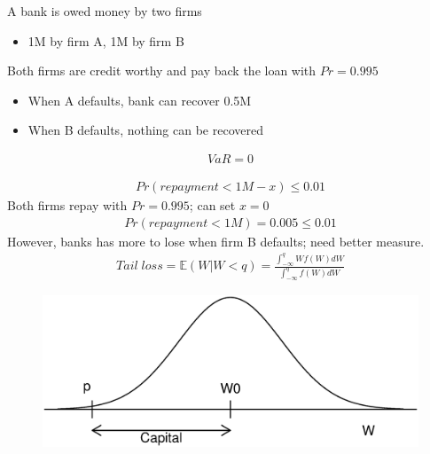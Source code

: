 \documentclass{beamer}
\begin{document}
\begin{frame} 
  A bank is owed money by two firms
  \begin{itemize}
    \item 1M by firm A, 1M by firm B
  \end{itemize}
  Both firms are credit worthy and pay back the loan with $Pr=0.995$
  \begin{itemize}
    \item When A defaults, bank can recover 0.5M
    \item When B defaults, nothing can be recovered
  \end{itemize}
  \begin{align}
    VaR=0
  \end{align}
\end{frame}

\begin{frame}
 \begin{align}
   Pr(repayment < 1M-x)\leq 0.01
 \end{align}
 Both firms repay with $Pr=0.995$; can set $x=0$
 \begin{align}
   Pr(repayment < 1M)=0.005 \leq 0.01
 \end{align}
 However, banks has more to lose when firm B defaults; need better measure.
 \begin{align}
    Tail\;loss = \mathbb{E}(W|W<q) = \frac{\int^q_{-\infty}Wf(W)dW}{\int^q_{-\infty}f(W)dW}
  \end{align}
\end{frame}

\begin{frame}
  \begin{figure}
    \includegraphics[scale=.3]{VaR2.eps}
  \end{figure}
\end{frame}
\end{document}
